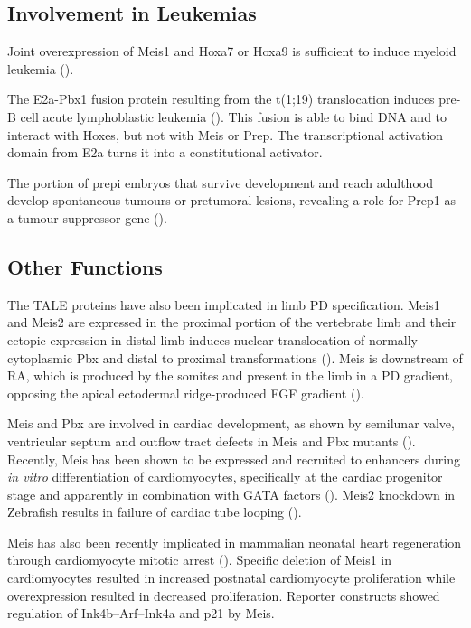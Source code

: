 \subsection{Involvement in Leukemias}

Joint overexpression of Meis1 and Hoxa7 or Hoxa9 is sufficient to induce myeloid leukemia (\cite{Nakamura1996, Schnabel2000}).

The E2a-Pbx1 fusion protein resulting from the t(1;19) translocation induces pre-B cell acute lymphoblastic leukemia (\cite{Kamps1990}). This fusion is able to bind DNA and to interact with Hoxes, but not with Meis or Prep. The transcriptional activation domain from E2a turns it into a constitutional activator. 

The portion of \ac{prepi} embryos that survive development and reach adulthood develop spontaneous tumours or pretumoral lesions, revealing a role for Prep1 as a tumour-suppressor gene (\cite{Longobardi2010}).

\subsection{Other Functions}

The \ac{TALE} proteins have also been implicated in limb \ac{PD} specification. Meis1 and Meis2 are expressed in the proximal portion of the vertebrate limb and their ectopic expression in distal limb induces nuclear translocation of normally cytoplasmic Pbx and distal to proximal transformations (\cite{Mercader1999}). Meis is downstream of \ac{RA}, which is produced by the somites and present in the limb in a \ac{PD} gradient, opposing the apical ectodermal ridge-produced FGF gradient (\cite{Mercader2000, Rosello-Diez2011}).

Meis and Pbx are involved in cardiac development, as shown by semilunar valve, ventricular septum and outflow tract defects in Meis and Pbx mutants (\cite{Stankunas2008}). Recently, Meis has been shown to be expressed and recruited to enhancers during \textit{in vitro} differentiation of cardiomyocytes, specifically at the cardiac progenitor stage and apparently in combination with GATA factors (\cite{Wamstad2012}). Meis2 knockdown in Zebrafish results in failure of cardiac tube looping (\cite{Paige2012}). 

Meis has also been recently implicated in mammalian neonatal heart regeneration through cardiomyocyte mitotic arrest (\cite{Mahmoud2013}). Specific deletion of Meis1 in cardiomyocytes resulted in increased postnatal cardiomyocyte proliferation while overexpression resulted in decreased proliferation. Reporter constructs showed regulation of Ink4b–Arf–Ink4a and p21 by Meis.


